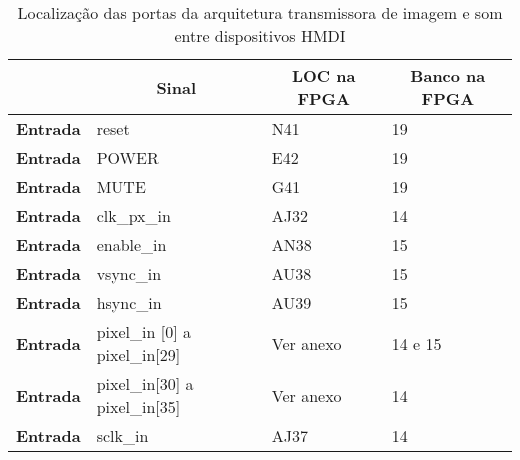 \begin{table}[h!]
	\centering
	\caption{Localização das portas da arquitetura transmissora de imagem e som entre dispositivos HMDI}
	\label{table:LOCplanC_simples}
	\begin{tabular}{rlll}
		\hline
		\multicolumn{1}{c}{\textbf{}}         & \multicolumn{1}{c}{\textbf{Sinal}}    & \multicolumn{1}{c}{\textbf{LOC na FPGA}} & \multicolumn{1}{c}{\textbf{Banco na FPGA}} \\ \hline
		\multicolumn{1}{r|}{\textbf{Entrada}} & reset                                 & N41                                      & 19                                         \\
		\multicolumn{1}{r|}{\textbf{Entrada}} & POWER                                 & E42                                      & 19                                         \\
		\multicolumn{1}{r|}{\textbf{Entrada}} & MUTE                                  & G41                                      & 19                                         \\
		\multicolumn{1}{r|}{\textbf{Entrada}} & clk\_px\_in                           & AJ32                                     & 14                                         \\
		\multicolumn{1}{r|}{\textbf{Entrada}} & enable\_in                            & AN38                                     & 15                                         \\
		\multicolumn{1}{r|}{\textbf{Entrada}} & vsync\_in                             & AU38                                     & 15                                         \\
		\multicolumn{1}{r|}{\textbf{Entrada}} & hsync\_in                             & AU39                                     & 15                                         \\
		\multicolumn{1}{r|}{\textbf{Entrada}} & pixel\_in {[}0{]} a pixel\_in{[}29{]} & Ver anexo                                & 14 e 15                                    \\
		\multicolumn{1}{r|}{\textbf{Entrada}} & pixel\_in{[}30{]} a pixel\_in{[}35{]} & Ver anexo                                & 14                                         \\
		\multicolumn{1}{r|}{\textbf{Entrada}} & sclk\_in                              & AJ37                                     & 14                                         \\

\end{tabular}
\end{table}
